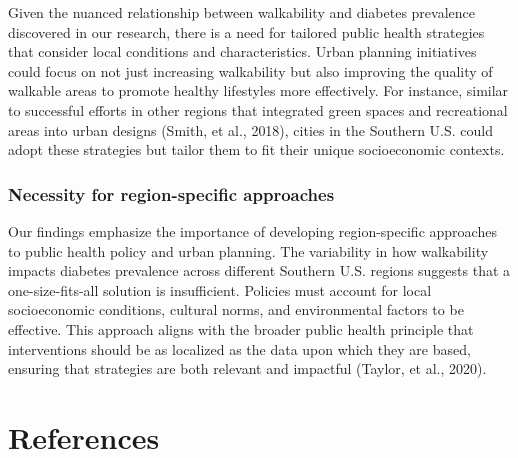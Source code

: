\documentclass[
]{article}
\begin{document}
Given the nuanced relationship between walkability and diabetes
prevalence discovered in our research, there is a need for tailored
public health strategies that consider local conditions and
characteristics. Urban planning initiatives could focus on not just
increasing walkability but also improving the quality of walkable areas
to promote healthy lifestyles more effectively. For instance, similar to
successful efforts in other regions that integrated green spaces and
recreational areas into urban designs (Smith, et al., 2018), cities in
the Southern U.S. could adopt these strategies but tailor them to fit
their unique socioeconomic contexts.

\subsubsection{Necessity for region-specific
approaches}\label{necessity-for-region-specific-approaches}

Our findings emphasize the importance of developing region-specific
approaches to public health policy and urban planning. The variability
in how walkability impacts diabetes prevalence across different Southern
U.S. regions suggests that a one-size-fits-all solution is insufficient.
Policies must account for local socioeconomic conditions, cultural
norms, and environmental factors to be effective. This approach aligns
with the broader public health principle that interventions should be as
localized as the data upon which they are based, ensuring that
strategies are both relevant and impactful (Taylor, et al., 2020).

\newpage{}

\section{References}\label{references}
\end{document}
